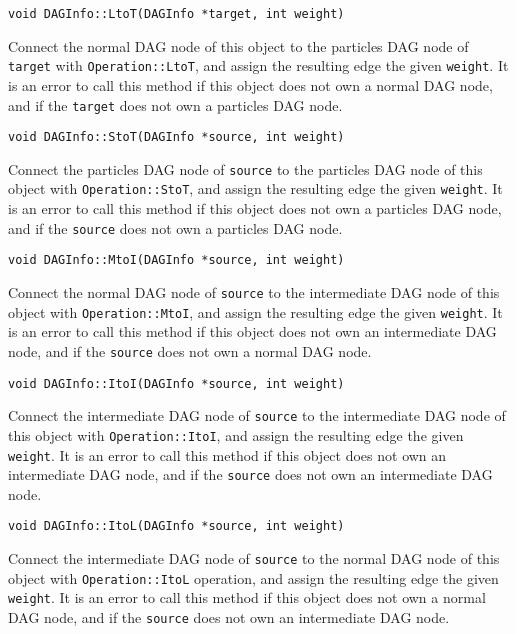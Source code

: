 \begin{lstlisting}
void DAGInfo::LtoT(DAGInfo *target, int weight)
\end{lstlisting}


Connect the normal DAG node of this object to the particles DAG node of
\texttt{target} with \texttt{Operation::LtoT}, and assign the resulting edge
the given \texttt{weight}. It is an error to call this method if this object
does not own a normal DAG node, and if the \texttt{target} does not own a
particles DAG node.

\begin{lstlisting}
void DAGInfo::StoT(DAGInfo *source, int weight)
\end{lstlisting}


Connect the particles DAG node of \texttt{source} to the particles DAG node of
this object with \texttt{Operation::StoT}, and assign the resulting edge the
given \texttt{weight}. It is an error to call this method if this object does
not own a particles DAG node, and if the \texttt{source} does not own a
particles DAG node.

\begin{lstlisting}
void DAGInfo::MtoI(DAGInfo *source, int weight)
\end{lstlisting}


Connect the normal DAG node of \texttt{source} to the intermediate DAG node of
this object with \texttt{Operation::MtoI}, and assign the resulting edge the
given \texttt{weight}. It is an error to call this method if this object does
not own an intermediate DAG node, and if the \texttt{source} does not own a
normal DAG node.

\begin{lstlisting}
void DAGInfo::ItoI(DAGInfo *source, int weight)
\end{lstlisting}


Connect the intermediate DAG node of \texttt{source} to the intermediate DAG
node of this object with \texttt{Operation::ItoI}, and assign the resulting
edge the given \texttt{weight}. It is an error to call this method if this
object does not own an intermediate DAG node, and if the \texttt{source} does
not own an intermediate DAG node.

\begin{lstlisting}
void DAGInfo::ItoL(DAGInfo *source, int weight)
\end{lstlisting}


Connect the intermediate DAG node of \texttt{source} to the normal DAG node of
this object with \texttt{Operation::ItoL} operation, and assign the resulting
edge the given \texttt{weight}. It is an error to call this method if this
object does not own a normal DAG node, and if the \texttt{source} does
not own an intermediate DAG node.



